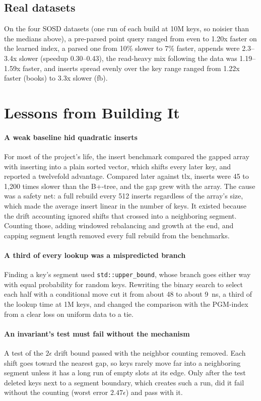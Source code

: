\documentclass[conference]{IEEEtran}
\begin{document}
\subsection{Real datasets}

On the four SOSD datasets (one run of each build at 10M keys, so noisier
than the medians above), a pre-parsed point query ranged from even to 1.20x
faster on the learned index, a parsed one from 10\% slower to 7\% faster, appends
were 2.3--3.4x slower (speedup 0.30--0.43), the read-heavy mix following the data
was 1.19--1.59x faster, and inserts spread evenly over the key range ranged from
1.22x faster (books) to 3.3x slower (fb).

\section{Lessons from Building It}
\label{sec:lessons}

\paragraph{A weak baseline hid quadratic inserts} For most of the
project's life, the insert benchmark compared the gapped array with
inserting into a plain sorted vector, which shifts every later key, and
reported a twelvefold advantage. Compared later against tlx, inserts were
45 to 1,200 times slower than the B+-tree, and the gap grew with the array.
The cause was a safety net: a full rebuild every 512 inserts regardless of
the array's size, which made the average insert linear in the number of
keys. It existed because the drift accounting ignored shifts that crossed
into a neighboring segment. Counting those, adding windowed rebalancing and
growth at the end, and capping segment length removed every full rebuild
from the benchmarks.

\paragraph{A third of every lookup was a mispredicted branch} Finding a
key's segment used \texttt{std::upper\_bound}, whose branch goes either way
with equal probability for random keys. Rewriting the binary search to
select each half with a conditional move cut it from about 48 to about
9~ns, a third of the lookup time at 1M keys, and changed the comparison with
the PGM-index from a clear loss on uniform data to a tie.

\paragraph{An invariant's test must fail without the mechanism} A test of
the $2\epsilon$ drift bound passed with the neighbor counting removed. Each shift
goes toward the nearest gap, so keys rarely move far into a neighboring segment
unless it has a long run of empty slots at its edge. Only after the test deleted
keys next to a segment boundary, which creates such a run, did it fail without
the counting (worst error $2.47\epsilon$) and pass with it.
\end{document}
